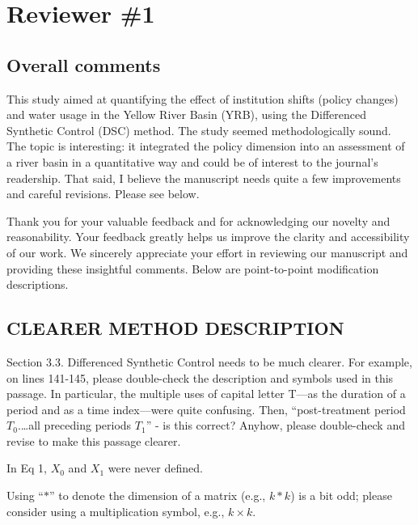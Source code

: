 \section{Reviewer \#1}\label{reviewer_1}

\subsection*{Overall comments}

\RC{} This study aimed at quantifying the effect of institution shifts (policy changes) and water usage in the Yellow River Basin (YRB), using the Differenced Synthetic Control (DSC) method. The study seemed methodologically sound. The topic is interesting: it integrated the policy dimension into an assessment of a river basin in a quantitative way and could be of interest to the journal's readership. That said, I believe the manuscript needs quite a few improvements and careful revisions. Please see below.

\AR{} Thank you for your valuable feedback and for acknowledging our novelty and reasonability. Your feedback greatly helps us improve the clarity and accessibility of our work. We sincerely appreciate your effort in reviewing our manuscript and providing these insightful comments. Below are point-to-point modification descriptions.

\subsection{CLEARER METHOD DESCRIPTION}\label{sec:1-1}

\RC{} Section 3.3. Differenced Synthetic Control needs to be much clearer. For example, on lines 141-145, please double-check the description and symbols used in this passage. In particular, the multiple uses of capital letter T—as the duration of a period and as a time index—were quite confusing. Then, ``post-treatment period $T_0$.\ldots all preceding periods $T_1$'' - is this correct? Anyhow, please double-check and revise to make this passage clearer.

\RC*{} In Eq 1, $X_0$ and $X_1$ were never defined.

\RC*{} Using ``$*$'' to denote the dimension of a matrix (e.g., $k*k$) is a bit odd; please consider using a multiplication symbol, e.g., $k \times k$.

